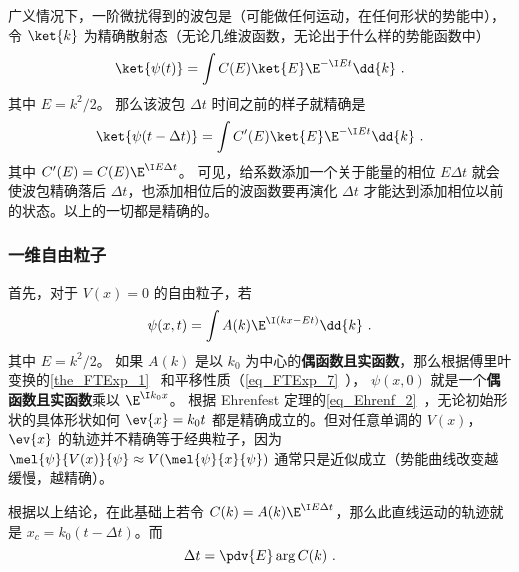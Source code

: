 
\begin{issues}
\issueDraft
\end{issues}

广义情况下，一阶微扰得到的波包是（可能做任何运动，在任何形状的势能中）， 令 $\ket{k}$ 为精确散射态（无论几维波函数，无论出于什么样的势能函数中）
\begin{equation}
\ket{\psi(t)} = \int C(E)\ket{E}\E^{-\I Et}\dd{k}~.
\end{equation}
其中 $E = k^2/2$。 那么该波包 $\Delta t$ 时间之前的样子就精确是
\begin{equation}
\ket{\psi(t-\Delta t)} = \int C'(E)\ket{E}\E^{-\I Et}\dd{k}~.
\end{equation}
其中 $C'(E) = C(E)\E^{\I E \Delta t}$。 可见，给系数添加一个关于能量的相位 $E \Delta t$ 就会使波包精确落后 $\Delta t$，也添加相位后的波函数要再演化 $\Delta t$ 才能达到添加相位以前的状态。以上的一切都是精确的。

\subsubsection{一维自由粒子}
首先，对于 $V(x)=0$ 的自由粒子，若
\begin{equation}
\psi(x,t) = \int A(k)\E^{\I (kx-Et)} \dd{k}~.
\end{equation}
其中 $E=k^2/2$。 如果 $A(k)$ 是以 $k_0$ 为中心的\textbf{偶函数且实函数}，那么根据傅里叶变换的\autoref{the_FTExp_1}~ 和平移性质（\autoref{eq_FTExp_7}~）， $\psi(x,0)$ 就是一个\textbf{偶函数且实函数}乘以 $\E^{\I k_0 x}$。 根据 Ehrenfest 定理的\autoref{eq_Ehrenf_2}~，无论初始形状的具体形状如何 $\ev{x} = k_0 t$ 都是精确成立的。但对任意单调的 $V(x)$， $\ev{x}$ 的轨迹并不精确等于经典粒子，因为 $\mel{\psi}{V(x)}{\psi} \approx V(\mel{\psi}{x}{\psi})$ 通常只是近似成立（势能曲线改变越缓慢，越精确）。

根据以上结论，在此基础上若令 $C(k) = A(k)\E^{\I E\Delta t}$，那么此直线运动的轨迹就是 $x_c = k_0(t-\Delta t)$。而
\begin{equation}
\Delta t = \pdv{E} \arg C(k)~.
\end{equation}

